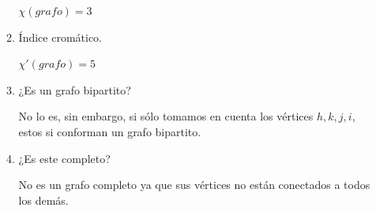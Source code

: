 \documentclass[spanish, fleqn]{article}
\begin{document}
\begin{enumerate}
\begin{enumerate}
$\chi(grafo) = 3$

\item{Índice cromático.}

$\chi'(grafo)= 5$

\item{¿Es un grafo bipartito?}

No lo es, sin embargo, si sólo tomamos en cuenta los vértices $h,k,j,i$, estos si conforman un grafo bipartito.
\item{¿Es este completo?}

No es un grafo completo ya que sus vértices no están conectados a todos los demás.
\end{enumerate}

\end{enumerate}
\end{document}
